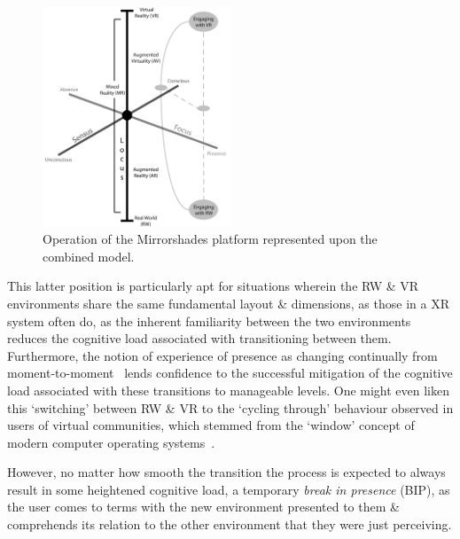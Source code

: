 \documentclass[conference]{acmsiggraph}
\begin{document}
\begin{figure}[h]
	\begin{center}
		\includegraphics[width=0.5\textwidth]{images/focus-locus-sensus-with-virtuality-continuum-with-transition-updated.png}
		\caption{Operation of the Mirrorshades platform represented upon the combined model.}
		\label{focus-locus-sensus-with-virtuality-continuum-with-transition}
	\end{center}	
\end{figure}

This latter position is particularly apt for situations wherein the RW \& VR environments share the same fundamental layout \& dimensions, as those in a XR system often do, as the inherent familiarity between the two environments reduces the cognitive load associated with transitioning between them. Furthermore, the notion of experience of presence as changing continually from moment-to-moment~\cite{Heeter2003} \cite{Ijsselsteijn1998} lends confidence to the successful mitigation of the cognitive load associated with these transitions to manageable levels. One might even liken this `switching' between RW \& VR to the `cycling through' behaviour observed in users of virtual communities, which stemmed from the `window' concept of modern computer operating systems~\cite{Turkle2004}.

However, no matter how smooth the transition the process is expected to always result in some heightened cognitive load, a temporary \textit{break in presence}\breakinpresencefootnote{} (BIP), as the user comes to terms with the new environment presented to them \& comprehends its relation to the other environment that they were just perceiving.

\end{document}
